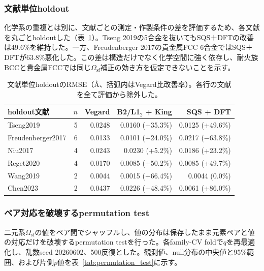 \documentclass[5p,10pt]{elsarticle}
\begin{document}
\subsubsection{文献単位holdout}
\label{sec:reference_holdout}

化学系の重複とは別に、文献ごとの測定・作製条件の差を評価するため、各文献を丸ごとholdoutした（表~\ref{tab:reference_holdout}）。Tseng 2019の5合金を抜いてもSQS＋DFTの改善は49.6\%を維持した。一方、Freudenberger 2017の貴金属FCC 6合金ではSQS＋DFTが63.8\%悪化した。この差は構造だけでなく化学空間に強く依存し、耐火族BCCと貴金属FCCでは同じ$\Omega_\text{sf}$補正の効き方を仮定できないことを示す。

\begin{table}[H]
\centering
\caption{文献単位holdoutのRMSE（\AA、括弧内はVegard比改善率）。各行の文献を全て評価から除外した。}
\label{tab:reference_holdout}
\scriptsize
\begin{tabular}{@{}lrrrr@{}}
\toprule
holdout文献 & $n$ & Vegard & B2/L1$_2$ + King & SQS + DFT \\
\midrule
Tseng2019 & 5 & 0.0248 & 0.0160 (+35.3\%) & 0.0125 (+49.6\%) \\
Freudenberger2017 & 6 & 0.0133 & 0.0101 (+24.0\%) & 0.0217 ($-$63.8\%) \\
Niu2017 & 4 & 0.0243 & 0.0230 (+5.2\%) & 0.0186 (+23.2\%) \\
Reget2020 & 4 & 0.0170 & 0.0085 (+50.2\%) & 0.0085 (+49.7\%) \\
Wang2019 & 2 & 0.0044 & 0.0015 (+66.4\%) & 0.0044 (0.0\%) \\
Chen2023 & 2 & 0.0437 & 0.0226 (+48.4\%) & 0.0061 (+86.0\%) \\
\bottomrule
\end{tabular}
\end{table}

\subsubsection{ペア対応を破壊するpermutation test}
\label{sec:permutation_test}

二元系$\Omega_\text{sf}$の値をペア間でシャッフルし、値の分布は保存したまま元素ペアと値の対応だけを破壊するpermutation testを行った。各family-CV foldで$q$を再最適化し、乱数seed 20260602、500反復とした。観測値、null分布の中央値と95\%範囲、および片側$p$値を表~\ref{tab:permutation_test}に示す。
\end{document}
